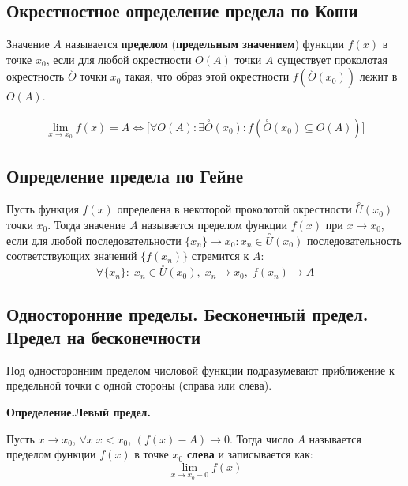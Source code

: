 \documentclass[a4paper,12pt,oneside]{extbook}
\newcommand{\newpar}{$ $\par\nobreak\ignorespaces}
\newenvironment{definition}[1][]{\noindent\textbf{Определение.\if\relax\detokenize{#1}\relax\else\;#1.\fi}\newpar}{\bigskip}
\theoremstyle{numbered}
\theoremstyle{unnumbered}
\theoremstyle{named}
\theoremstyle{unnumbered}
\theoremstyle{named}
\theoremstyle{named}
\theoremstyle{named}
\begin{document}
\subsection{Окрестностное определение предела по Коши}
Значение \(A\) называется \textbf{пределом} (\textbf{предельным значением}) функции \(f(x)\) в точке \(x_0\), если для любой окрестности \(O(A)\) точки \(A\) существует проколотая окрестность \(\overset{\circ}{O}\) точки \(x_0\) такая, что образ этой окрестности \(f(\overset{\circ}{O}(x_0))\) лежит в \(O(A)\).

\begin{gather*}
    \lim_{x \to x_0}{f(x)} = A \iff \Big[ \forall O(A): \exists \overset{\circ}{O}(x_0): f(\overset{\circ}{O}(x_0) \subseteq O(A)) \Big]
\end{gather*}

\subsection{Определение предела по Гейне}%
\label{sub:Определение предела по Гейне}
Пусть функция \(f(x)\) определена в некоторой проколотой окрестности \(\overset{\circ}{U}(x_0)\) точки \(x_0\). Тогда значение \(A\) называется пределом функции \(f(x)\) при \(x \to x_0\), если для любой последовательности \(\{x_n\} \to x_0: x_n \in \overset{\circ}{U}(x_0)\) последовательность соответствующих значений \(\{f(x_n)\}\) стремится к \(A\):
\[
    \forall \{x_n\}:\; x_n \in \overset{\circ}{U}(x_0),\; x_n \to x_0,\; f(x_n) \to A
\]

\subsection{Односторонние пределы. Бесконечный предел. Предел на бесконечности}%
\label{sub:Односторонние пределы. Бесконечный предел. Предел на бесконечности}

\begin{siderules}
    Под односторонним пределом числовой функции подразумевают приближение к предельной точки с одной стороны (справа или слева).
\end{siderules}

\begin{definition}[Левый предел]
    Пусть \(x \to x_0\), \(\forall x \; x < x_0\), \((f(x) - A) \to 0\). Тогда число \(A\) называется пределом функции \(f(x)\) в точке \(x_0\) \textbf{слева} и записывается как:
    \[
        \lim_{x \to x_0 - 0}{f(x)}
    \]
\end{definition}
\end{document}
